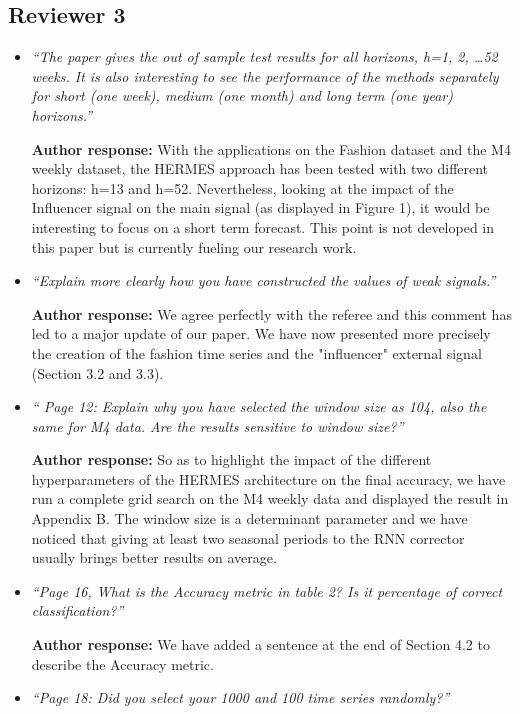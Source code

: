\documentclass[11pt]{article}
\begin{document}
\subsection*{Reviewer 3}
\begin{itemize}
\item {\em ``The paper gives the out of sample test results for all horizons, h=1, 2, …52 weeks. It is also interesting to see the performance of the methods separately for short (one week), medium (one month) and long term (one year) horizons.''} \medskip

\textbf{Author response:} With the applications on the Fashion dataset and the M4 weekly dataset, the HERMES approach has been tested with two different horizons: h=13 and h=52. Nevertheless, looking at the impact of the Influencer signal on the main signal (as displayed in Figure 1), it would be interesting to focus on a short term forecast. This point is not developed in this paper but is currently fueling our research work.

\item {\em ``Explain more clearly how you have constructed the values of weak signals.''} \medskip

\textbf{Author response:}  We agree perfectly with the referee and this comment has led to a major update of our paper. We have now presented more precisely the creation of the fashion time series and the "influencer" external signal (Section 3.2 and 3.3).

\item {\em `` Page 12: Explain why you have selected the window size as 104, also the same for M4 data. Are the results sensitive to window size?''} \medskip

\textbf{Author response:} So as to highlight the impact of the different hyperparameters of the HERMES architecture on the final accuracy, we have run a complete grid search on the M4 weekly data and displayed the result in Appendix B. The window size is a determinant parameter and we have noticed that giving at least two seasonal periods to the RNN corrector usually brings better results on average. 

\item {\em ``Page 16, What is the Accuracy metric in table 2? Is it percentage of correct classification?''} \medskip

\textbf{Author response:} We have added a sentence at the end of Section 4.2 to describe the Accuracy metric.

\item {\em ``Page 18: Did you select your 1000 and 100 time series randomly?''} \medskip


\end{itemize}
\end{document}
